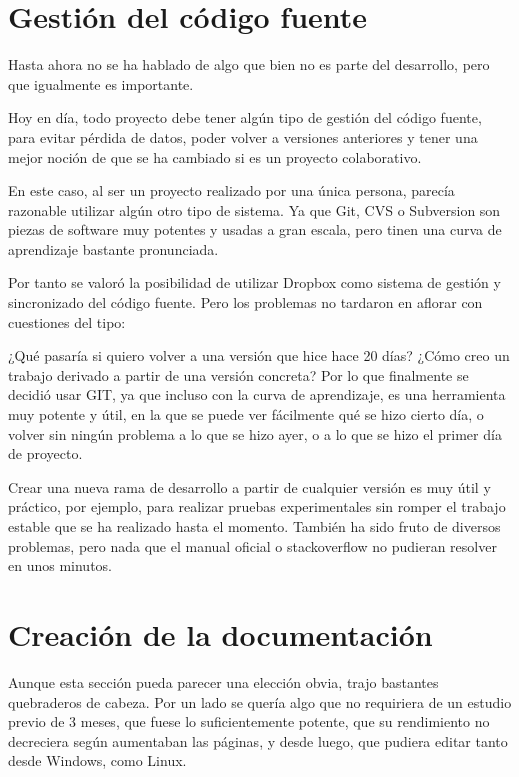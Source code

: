 \section{Gesti\'{o}n del c\'{o}digo fuente}
Hasta ahora no se ha hablado de algo que bien no es parte del desarrollo, pero que igualmente es importante.

Hoy en d\'ia, todo proyecto debe tener alg\'un tipo de gesti\'on del c\'odigo fuente, para evitar p\'erdida de datos, 
poder volver a versiones anteriores y tener una mejor noci\'on de que se ha cambiado si es un proyecto colaborativo.

En este caso, al ser un proyecto realizado por una \'unica persona, parec\'ia razonable utilizar alg\'un otro tipo
de sistema. Ya que Git, CVS o Subversion son piezas de software muy potentes y usadas a gran escala, pero tinen
una curva de aprendizaje bastante pronunciada.

Por tanto se valor\'o la posibilidad de utilizar Dropbox como sistema de gesti\'on y sincronizado del c\'odigo fuente.
Pero los problemas no tardaron en aflorar con cuestiones del tipo:

¿Qu\'e pasar\'ia si quiero volver a una versi\'on que hice hace 20 d\'ias? ¿C\'omo creo un trabajo derivado a partir
de una versi\'on concreta? Por lo que finalmente se decidi\'o usar GIT, ya que incluso con la curva de aprendizaje,
es una herramienta muy potente y \'util, en la que se puede ver f\'acilmente qu\'e se hizo cierto d\'ia, o volver sin 
ning\'un problema a lo que se hizo ayer, o a lo que se hizo el primer d\'ia de proyecto.

Crear una nueva rama de desarrollo a partir de cualquier versi\'on es muy \'util y pr\'actico, por ejemplo, para
realizar pruebas experimentales sin romper el trabajo estable que se ha realizado hasta el momento. Tambi\'en
ha sido fruto de diversos problemas, pero nada que el manual oficial o stackoverflow no pudieran
resolver en unos minutos.

\section{Creaci\'{o}n de la documentaci\'{o}n}
Aunque esta secci\'{o}n pueda parecer una elecci\'{o}n obvia, trajo bastantes quebraderos de cabeza. Por un lado
se quer\'{i}a algo que no requiriera
de un estudio previo de 3 meses, que fuese lo suficientemente potente, que su rendimiento no decreciera seg\'{u}n aumentaban las 
p\'{a}ginas, y desde luego,
que pudiera editar tanto desde Windows, como Linux.

